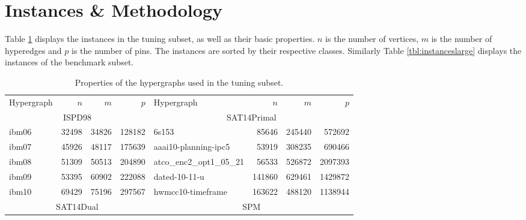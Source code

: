 \documentclass[a4paper,12pt,titlepage, BCOR7mm,headsepline]{scrbook}
\numberwithin{equation}{section}
\begin{document}
\section{Instances \& Methodology}
\label{sec:methodology}
Table \ref{tbl:instancessmall} displays the instances in the tuning subset, as well as their basic properties. $n$ is the number of vertices, $m$ is the number of hyperedges and $p$ is the number of pins. The instances are sorted by their respective classes. 
Similarly Table \ref{tbl:instanceslarge} displays the instances of the benchmark subset.
\begin{table}[H]
        \caption{Properties of the hypergraphs used in the tuning subset.}
\label{tbl:instancessmall}

\centering
\begin{adjustbox}{max width=\textwidth}
\begin{tabular}{lrrr||l|rrr}
Hypergraph & $n$& $m$ & $p$ & Hypergraph & $n$ & $m$ & $p$\\
                         \cline{1-4}
                         \cline{5-8}
                         \cline{5-8}
                         \cline{1-4}
                         \cline{1-4}
                         \multicolumn{4}{c||}{ISPD98}          & \multicolumn{4}{c}{SAT14Primal} \\
                         \cline{5-8}
                         \cline{5-8}
                         \cline{1-4}
                         \cline{1-4}

                         ibm06                                 & 32498   & 34826  & 128182 & 6s153                                                & 85646   & 245440 & 572692            \\
                         ibm07                                 & 45926   & 48117  & 175639& aaai10-planning-ipc5              & 53919   & 308235 & 690466   \\
                         ibm08                                 & 51309   & 50513  & 204890& atco\_enc2\_opt1\_05\_21                             & 56533   & 526872 & 2097393  \\
                         ibm09                                 & 53395   & 60902  & 222088& dated-10-11-u                                        & 141860  & 629461 & 1429872  \\
                         ibm10                                 & 69429   & 75196  & 297567& hwmcc10-timeframe & 163622  & 488120 & 1138944  \\
                         \cline{1-4}
                         \cline{1-4}
                         \cline{5-8}
                         \cline{5-8}
                         \multicolumn{4}{c||}{SAT14Dual} & \multicolumn{4}{c}{SPM} \\
                         \cline{5-8}
                         \cline{5-8}
                         \cline{1-4}
                         \cline{1-4}


\end{tabular}
\end{adjustbox}
\end{table}
\end{document}
